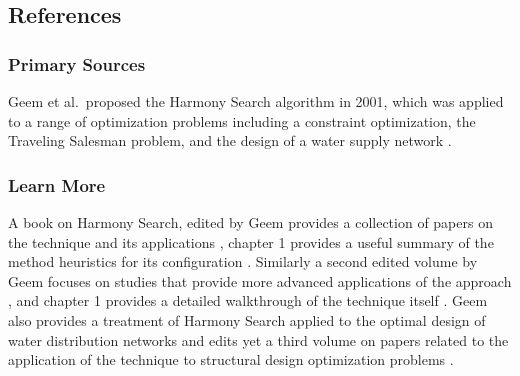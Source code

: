 

\subsection{References}

% 
% 
\subsubsection{Primary Sources}
Geem et al.\ proposed the Harmony Search algorithm in 2001, which was applied to a range of optimization problems including a constraint optimization, the Traveling Salesman problem, and the design of a water supply network \cite{Geem2001}.

% 
% 
\subsubsection{Learn More}
A book on Harmony Search, edited by Geem provides a collection of papers on the technique and its applications \cite{Geem2009}, chapter 1 provides a useful summary of the method heuristics for its configuration \cite{Yang2009}. Similarly a second edited volume by Geem focuses on studies that provide more advanced applications of the approach \cite{Geem2010}, and chapter 1 provides a detailed walkthrough of the technique itself \cite{Geem2010a}. Geem also provides a treatment of Harmony Search applied to the optimal design of water distribution networks \cite{Geem2009a} and edits yet a third volume on papers related to the application of the technique to structural design optimization problems \cite{Geem2009b}.


